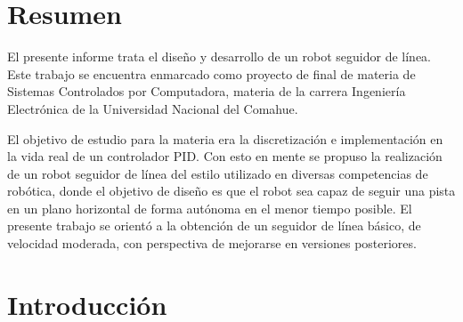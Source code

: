 \documentclass[10pt,conference,a4paper,onecolumn]{article}%
\begin{document}
\section{Resumen}
El presente informe trata el diseño y desarrollo de un robot seguidor de línea. Este trabajo se encuentra enmarcado como proyecto de final de materia de Sistemas Controlados por Computadora, materia de la carrera Ingeniería Electrónica de la Universidad Nacional del Comahue.

El objetivo de estudio para la materia era la discretización e implementación en la vida real de un controlador PID. Con esto en mente se propuso la realización de un robot seguidor de línea del estilo utilizado en diversas competencias de robótica, donde el objetivo de diseño es que el robot sea capaz de seguir una pista en un plano horizontal de forma autónoma en el menor tiempo posible. El presente trabajo se orientó a la obtención de un seguidor de línea básico, de velocidad moderada, con perspectiva de mejorarse en versiones posteriores.

\section{Introducción}
\end{document}
